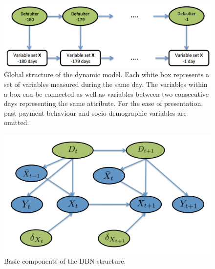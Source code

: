 \begin{figure}[htbp]
\begin{center}
\includegraphics[scale=0.45]{./figures/CajaMarModel1}
\caption{Global structure of the dynamic model. Each white box represents a set of variables measured during the same day. The variables within a box can be connected as well as variables between two consecutive days representing the same attribute. For the ease of presentation, past payment behaviour and socio-demographic variables are omitted.}
\label{fig:global_temp}
\end{center}
\end{figure}


\begin{figure}[htbp]
\begin{center}
\includegraphics[scale=0.45]{./figures/CajaMarModel2}
\caption{Basic components of the DBN structure.}
\label{fig:component}
\end{center}
\end{figure}

